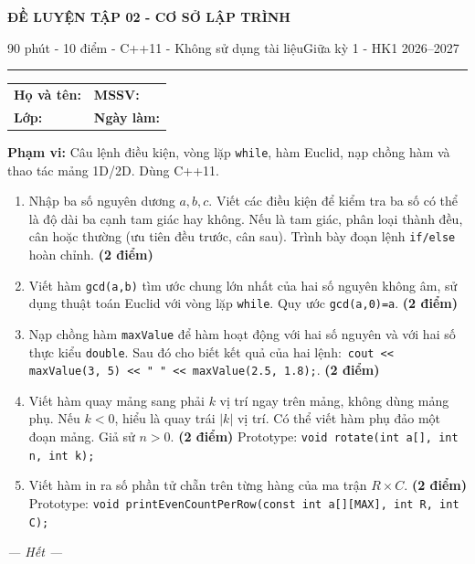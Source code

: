 \documentclass[11pt,a4paper]{article}
\newcommand{\examtitle}[4]{\begin{center}{\Large\bfseries\color{hcmusblue}#1}\par\vspace{3pt}{\large\bfseries #2}\par\vspace{3pt}\small #3\quad\textbullet\quad #4\end{center}\vspace{5pt}\hrule\vspace{8pt}}
\newcommand{\studentline}{\begin{tabularx}{\textwidth}{X X}\textbf{Họ và tên:} \hrulefill & \textbf{MSSV:} \hrulefill\\[7pt]\textbf{Lớp:} \hrulefill & \textbf{Ngày làm:} \hrulefill\end{tabularx}\vspace{8pt}}
\newcommand{\points}[1]{\hfill\textbf{(#1 điểm)}}
\begin{document}
\examtitle{ĐỀ LUYỆN TẬP 02 - CƠ SỞ LẬP TRÌNH}{CƠ SỞ LẬP TRÌNH - HCMUS (theo lịch học tuần 1--5)}{90 phút - 10 điểm - C++11 - Không sử dụng tài liệu}{Giữa kỳ 1 - HK1 2026--2027}

\studentline
\begin{notebox}\textbf{Phạm vi:} Câu lệnh điều kiện, vòng lặp \texttt{while}, hàm Euclid, nạp chồng hàm và thao tác mảng 1D/2D. Dùng C++11.\end{notebox}
\begin{enumerate}
\item Nhập ba số nguyên dương $a,b,c$. Viết các điều kiện để kiểm tra ba số có thể là độ dài ba cạnh tam giác hay không. Nếu là tam giác, phân loại thành đều, cân hoặc thường (ưu tiên đều trước, cân sau). Trình bày đoạn lệnh \texttt{if/else} hoàn chỉnh. \points{2}
\item Viết hàm \texttt{gcd(a,b)} tìm ước chung lớn nhất của hai số nguyên không âm, sử dụng thuật toán Euclid với vòng lặp \texttt{while}. Quy ước \texttt{gcd(a,0)=a}. \points{2}
\item Nạp chồng hàm \texttt{maxValue} để hàm hoạt động với hai số nguyên và với hai số thực kiểu \texttt{double}. Sau đó cho biết kết quả của hai lệnh:\
\texttt{cout << maxValue(3, 5) << " " << maxValue(2.5, 1.8);}. \points{2}
\item Viết hàm quay mảng sang phải $k$ vị trí ngay trên mảng, không dùng mảng phụ. Nếu $k<0$, hiểu là quay trái $|k|$ vị trí. Có thể viết hàm phụ đảo một đoạn mảng. Giả sử $n>0$. \points{2}
Prototype: \texttt{void rotate(int a[], int n, int k);}
\item Viết hàm in ra số phần tử chẵn trên từng hàng của ma trận $R\times C$. \points{2}
Prototype: \texttt{void printEvenCountPerRow(const int a[][MAX], int R, int C);}
\end{enumerate}
\vfill\begin{center}\textit{--- Hết ---}\end{center}
\end{document}
